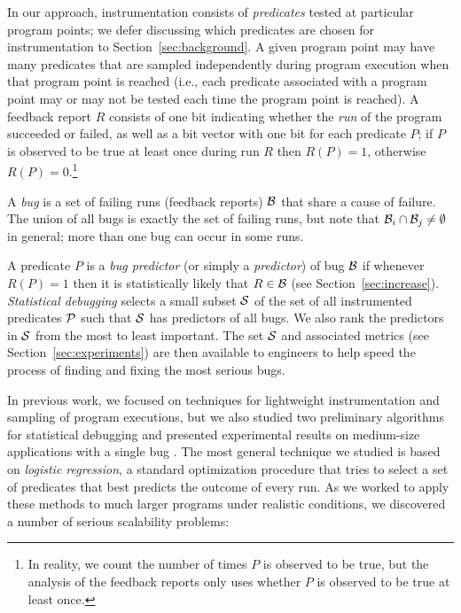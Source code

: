 \documentclass[draft]{sig-alternate}
\begin{document}
In our approach, instrumentation consists of {\em predicates} tested
at particular program points; we defer discussing which predicates are
chosen for instrumentation to Section~\ref{sec:background}.  A given
program point may have many predicates that are sampled independently
during program execution when that program point is reached (i.e.,
each predicate associated with a program point may or may not be
tested each time the program point is reached).  A feedback report $R$
consists of one bit indicating whether the {\em run} of the program
succeeded or failed, as well as a bit vector with one bit for each
predicate $P$; if $P$ is observed to be true at least once during run
$R$ then $R(P) = 1$, otherwise $R(P) = 0$.\footnote{In reality, we count
the number of times $P$ is observed to be true, but the analysis of
the feedback reports only uses whether $P$ is observed to be true at
least once.}

A {\em bug} is a set of failing runs (feedback reports) ${\cal B}$
that share a cause of failure.  The union of all bugs is exactly the
set of failing runs, but note that ${\cal B}_i \cap {\cal B}_j \neq
\emptyset$ in general; more than one bug can occur in some runs.

A predicate $P$ is a {\em bug predictor} (or simply a {\em predictor})
of bug ${\cal B}$ if whenever $R(P) = 1$ then it is statistically
likely that $R \in {\cal B}$ (see Section~\ref{sec:increase}).  {\em
Statistical debugging} selects a small subset ${\cal S}$ of the set of
all instrumented predicates ${\cal P}$ such that ${\cal S}$ has
predictors of all bugs.  We also rank the predictors in ${\cal S}$
from the most to least important.  The set ${\cal S}$ and associated
metrics (see Section~\ref{sec:experiments}) are then available to
engineers to help speed the process of finding and fixing the most
serious bugs.

In previous work, we focused on techniques
for lightweight instrumentation and sampling of program executions, but
we also studied two preliminary algorithms for statistical debugging and
presented experimental results on medium-size applications with a
single bug \cite{PLDI`03*141,Zheng:2003:SDSP}.  The most general
technique we studied is based on {\em logistic regression}, a standard
optimization procedure that tries to select a set of predicates that
best predicts the outcome of every run. As we worked to apply these
methods to much larger programs under realistic conditions, we
discovered a number of serious scalability problems:
\end{document}
